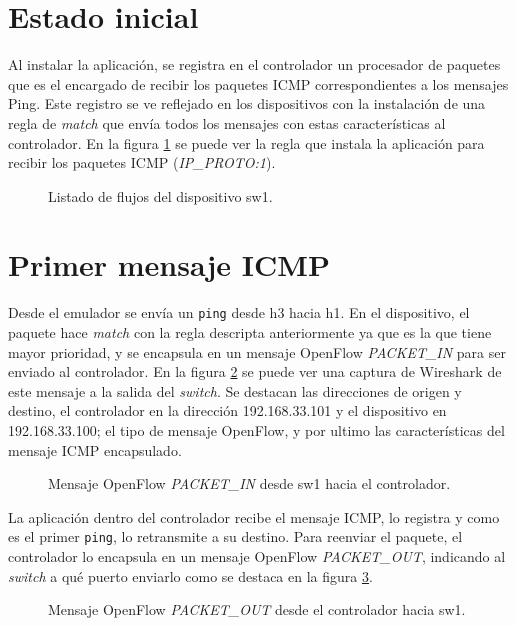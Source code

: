 \section{Estado inicial}
Al instalar la aplicación, se registra en el controlador un procesador de paquetes que es el encargado de recibir los paquetes ICMP correspondientes a los mensajes Ping. Este registro se ve reflejado en los dispositivos con la instalación de una regla de \textit{match} que envía todos los mensajes con estas características al controlador. En la figura \ref{fig:pcktprocessor} se puede ver la regla que instala la aplicación para recibir los paquetes ICMP (\textit{IP\_PROTO:1}).
\begin{figure}[th]
	\centering 
	\caption[Listado de flujos del dispositivo sw1]{Listado de flujos del dispositivo sw1.}
	\label{fig:pcktprocessor}
\end{figure}
\section{Primer mensaje ICMP}
Desde el emulador se envía un \texttt{ping} desde h3 hacia h1. En el dispositivo, el paquete hace \textit{match} con la regla descripta anteriormente ya que es la que tiene mayor prioridad, y se encapsula en un mensaje OpenFlow \textit{PACKET\_IN} para ser enviado al controlador. En la figura \ref{fig:packetin} se puede ver una captura de Wireshark de este mensaje a la salida del \textit{switch}. Se destacan las direcciones de origen y destino, el controlador en la dirección 192.168.33.101 y el dispositivo en 192.168.33.100; el tipo de mensaje OpenFlow, y por ultimo las características del mensaje ICMP encapsulado.
\begin{figure}[th] 
	\centering 
	\caption[Mensaje OpenFlow \textit{PACKET\_IN} desde sw1 hacia el controlador]{Mensaje OpenFlow \textit{PACKET\_IN} desde sw1 hacia el controlador.}
	\label{fig:packetin}
\end{figure}

La aplicación dentro del controlador recibe el mensaje ICMP, lo registra y como es el primer \texttt{ping}, lo retransmite a su destino. Para reenviar el paquete, el controlador lo encapsula en un mensaje OpenFlow \textit{PACKET\_OUT}, indicando al \textit{switch} a qué puerto enviarlo como se destaca en la figura \ref{fig:packetout}.

\begin{figure}[th] 
	\centering 
	\caption[Mensaje OpenFlow \textit{PACKET\_OUT} desde el controlador hacia sw1] {Mensaje OpenFlow \textit{PACKET\_OUT} desde el controlador hacia sw1.}
	\label{fig:packetout}
\end{figure}

